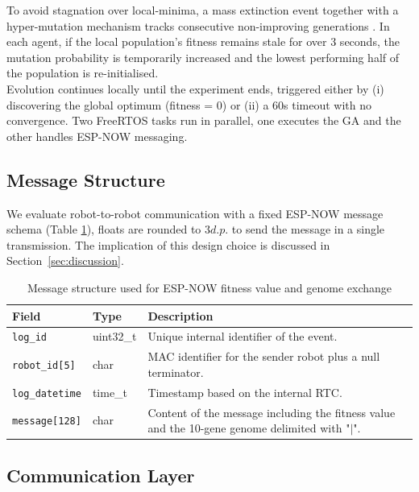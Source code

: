 \documentclass[conference]{IEEEtran}
\begin{document}
To avoid stagnation over local-minima, a mass extinction event together with a hyper-mutation mechanism tracks consecutive non-improving generations \cite{krink_self-organized_2001}. In each agent, if the local population's fitness remains stale for over 3 seconds, the mutation probability is temporarily increased and the lowest performing half of the population is re-initialised. \\ 

Evolution continues locally until the experiment ends, triggered either by (i) discovering the global optimum (fitness = 0) or (ii) a 60s timeout with no convergence. Two FreeRTOS tasks run in parallel, one executes the GA and the other handles ESP-NOW messaging.

\subsection{Message Structure}
We evaluate robot-to-robot communication with a fixed ESP-NOW message schema (Table \ref{tab:out_message}), floats are rounded to $3 d.p.$ to send the message in a single transmission. The implication of this design choice is discussed in Section~\ref{sec:discussion}.

\begin{table}[H]
  \centering
  \caption{Message structure used for ESP-NOW fitness value and genome exchange}
  \label{tab:out_message}
  \begin{tabular}{l l p{4cm}}
    \toprule
    \textbf{Field} & \textbf{Type} & \textbf{Description} \\
    \midrule
    \texttt{log\_id} & uint32\_t & Unique internal identifier of the event.\\
    \texttt{robot\_id[5]} & char & MAC identifier for the sender robot plus a null terminator.\\
    \texttt{log\_datetime} & time\_t & Timestamp based on the internal RTC.\\
    \texttt{message[128]} & char & Content of the message including the fitness value and the 10-gene genome delimited with "$|$".\\
    \bottomrule
  \end{tabular}
\end{table}

\subsection{Communication Layer}\label{sec:comm-layer}
\end{document}
